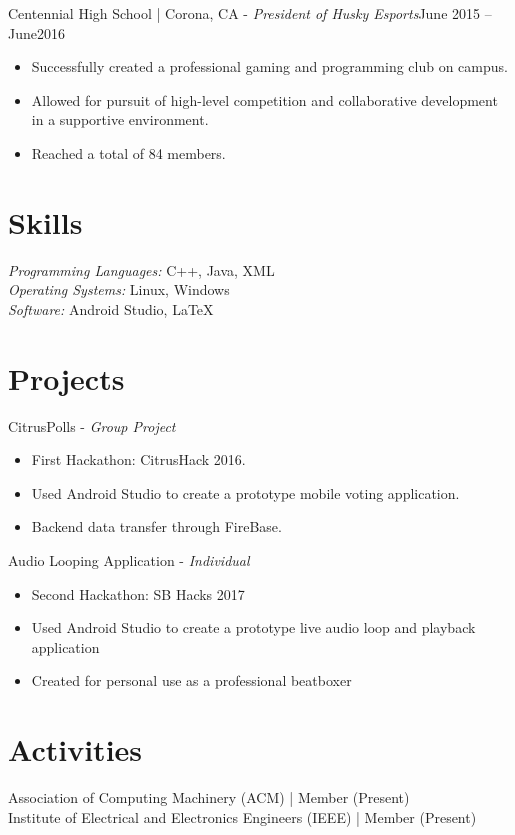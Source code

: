 \documentclass[letter]{res}
\begin{document}
\begin{resume}
 Centennial High School | Corona, CA \newline - {\sl President of Husky Esports}\hfill  June 2015 – June2016\\
  \vspace{-2mm}
 \begin{itemize}
 \item Successfully created a professional gaming and programming club on campus.
 \item Allowed for pursuit of high-level competition and collaborative development in a supportive environment.
 \item Reached a total of 84 members.
 \end{itemize}
  \vspace{-2mm}
  
\section{Skills}
{\sl Programming Languages:}  C++, Java, XML \\
{\sl Operating Systems:} Linux, Windows \\ 
{\sl Software:} Android Studio, \LaTeX \\ 
 \vspace{-2mm}

\section{Projects}
CitrusPolls \newline - {\sl Group Project} \\
\begin{itemize}
  \vspace{-2mm}
  \item First Hackathon: CitrusHack 2016.
  \item Used Android Studio to create a prototype mobile voting application.
  \item Backend data transfer through FireBase.
\end{itemize}

Audio Looping Application \newline - {\sl Individual}
\begin{itemize}
  \vspace{2mm}
  \item Second Hackathon: SB Hacks 2017
  \item Used Android Studio to create a prototype live audio loop and playback application 
  \item Created for personal use as a professional beatboxer
\end{itemize}
  

\section{Activities} 
 Association of Computing Machinery (ACM) | Member (Present) \\
 Institute of Electrical and Electronics Engineers (IEEE) | Member (Present) \\

\end{resume}
\end{document}
